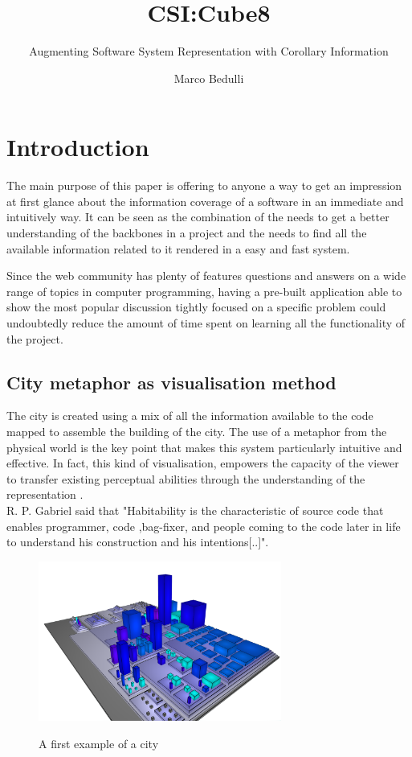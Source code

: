 \documentclass[]{usiinfbachelorproject}
\author{Marco Bedulli}
\title{CSI:Cube8}
\subtitle{Augmenting Software System Representation with Corollary Information}
\begin{document}
\maketitle

\tableofcontents 


\pagebreak
\listoffigures

\pagebreak

\section{Introduction} \label{introduction}

The main purpose of this paper is offering to anyone a way to get an impression at first glance about the information coverage of a software in an immediate and intuitively way. It can be seen as the combination of the needs to get a better understanding of the backbones in a project and the needs to find all the available information related to it rendered in a easy and fast system.

Since the web community has plenty of features questions and answers on a wide range of topics in computer programming, having a pre-built application able to show the most popular discussion tightly focused on a specific problem could undoubtedly reduce the amount of time spent on learning all the functionality of the project.



\subsection{City metaphor as visualisation method } 


The city is created using a mix of all the information available to the code mapped to assemble the building of the city. The use of a metaphor from the physical world is the key point that makes this system particularly intuitive and effective. In fact, this kind of visualisation, empowers the capacity of the viewer to transfer existing perceptual abilities through the understanding of the representation .\\
R. P. Gabriel \cite{gabry} said that "Habitability is the characteristic of source code that enables programmer, code ,bag-fixer, and people coming to the code later in life to understand his construction and his intentions[..]". 
\begin{figure}[h]
	\centering
\includegraphics[width=8cm]{images/city1}
\label {myO}
\caption{A first example of a city}
\end{figure}
\end{document}
